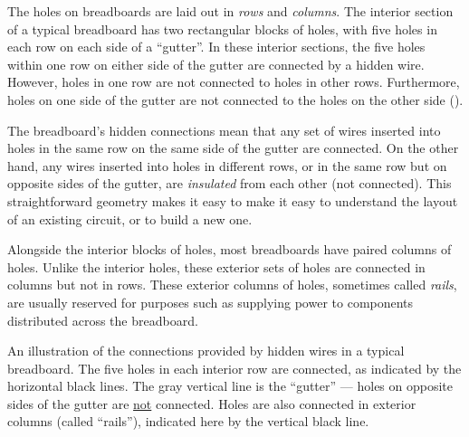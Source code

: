 
The holes on breadboards are laid out in \emph{rows} and \emph{columns}. 
The interior section of a typical breadboard has two rectangular blocks of holes, with five holes in each row on each side of a ``gutter''. 
In these interior sections, the five holes within one row on either side of the gutter are connected by a hidden wire. 
However, holes in one row are not connected to holes in other rows. 
Furthermore, holes on one side of the gutter are not connected to the holes on the other side ().

The breadboard's hidden connections mean that any set of wires inserted into holes in the same row on the same side of the gutter are connected. 
On the other hand, any wires inserted into holes in different rows, or in the same row but on opposite sides of the gutter, are \emph{insulated} from each other (not connected). 
This straightforward geometry makes it easy to make it easy to understand the layout of an existing circuit, or to build a new one. 
 
Alongside the interior blocks of holes, most breadboards have paired columns of holes. 
Unlike the interior holes, these exterior sets of holes are connected in columns but not in rows. 
These exterior columns of holes, sometimes called \emph{rails}, are usually reserved for purposes such as supplying power to components distributed across the breadboard. 

\begin{marginfigure}[-4 cm]
	\begin{center}
		\caption[Breadboard connections schematic]{An illustration of the connections provided by hidden wires in a typical breadboard. The five holes in each interior row are connected, as indicated by the horizontal black lines. The gray vertical line is the ``gutter'' --- holes on opposite sides of the gutter are \underline{not} connected. Holes are also connected in exterior columns (called ``rails''), indicated here by the vertical black line.}
	\end{center}
\end{marginfigure}

